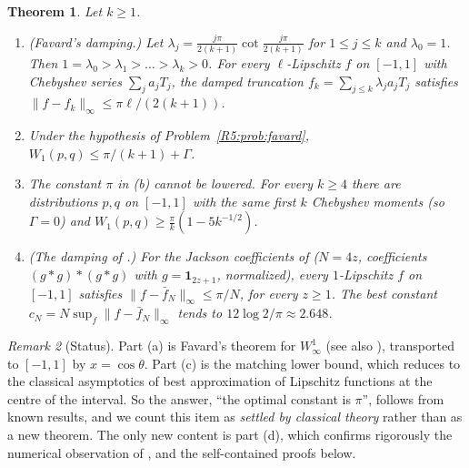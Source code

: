 \documentclass[11pt]{amsart}
\newtheorem{theorem}{Theorem}[section]
\theoremstyle{definition}
\theoremstyle{remark}
\newtheorem{remark}[theorem]{Remark}
\begin{document}
\begin{theorem}\label{R5:thm:favard}
Let $k\ge1$.
\begin{enumerate}
\item[(a)] (Favard's damping.)  Let
 $\lambda_j=\frac{j\pi}{2(k+1)}\cot\frac{j\pi}{2(k+1)}$ for $1\le j\le k$ and
 $\lambda_0=1$.  Then $1=\lambda_0>\lambda_1>\dots>\lambda_k>0$.  For every
 $\ell$-Lipschitz $f$ on $[-1,1]$ with Chebyshev series $\sum_ja_jT_j$, the
 damped truncation $f_k=\sum_{j\le k}\lambda_ja_jT_j$ satisfies
 $\|f-f_k\|_\infty\le\pi\ell/(2(k+1))$.
\item[(b)] Under the hypothesis of Problem~\ref{R5:prob:favard},
 $W_1(p,q)\le\pi/(k+1)+\Gamma$.
\item[(c)] The constant $\pi$ in (b) cannot be lowered.  For every $k\ge4$
 there are distributions $p,q$ on $[-1,1]$ with the same first $k$ Chebyshev
 moments (so $\Gamma=0$) and $W_1(p,q)\ge\frac\pi k(1-5k^{-1/2})$.
\item[(d)] (The damping of \cite{R5-BKM22}.)  For the Jackson coefficients
 of \cite{R5-BKM22} ($N=4z$, coefficients $(g*g)*(g*g)$ with
 $g=\mathbf 1_{2z+1}$, normalized), every $1$-Lipschitz $f$ on $[-1,1]$
 satisfies $\|f-\bar f_N\|_\infty\le\pi/N$, for every $z\ge1$.  The best
 constant $c_N=N\sup_f\|f-\bar f_N\|_\infty$ tends to
 $12\log2/\pi\approx2.648$.
\end{enumerate}
\end{theorem}

\begin{remark}[Status]\label{R5:rem:favardstatus}
Part (a) is Favard's theorem for $W^1_\infty$ \cite{R5-Favard37,R5-AK37}
(see also \cite[Ch.~4]{R5-Korneichuk}), transported to $[-1,1]$ by
$x=\cos\theta$.  Part (c) is the matching lower bound, which reduces to the
classical asymptotics of best approximation of Lipschitz functions at the
centre of the interval.  So the answer, ``the optimal constant is $\pi$'',
follows from known results, and we count this item as \emph{settled by
classical theory} rather than as a new theorem.  The only new content is
part (d), which confirms rigorously the numerical observation of
\cite{R5-BKM22}, and the self-contained proofs below.
\end{remark}
\end{document}

